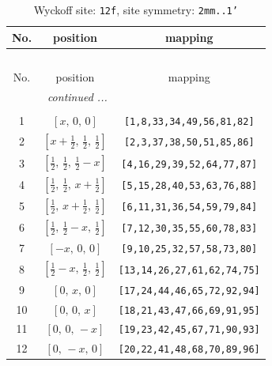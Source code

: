 \documentclass[fleqn,8pt]{jsarticle}
\begin{document}
\begin{longtable}{ccc}
\caption{Wyckoff site: {\tt 12f}, site symmetry: {\tt 2mm..1'}}
 \\
 \hline \hline
No. & position & mapping \\ \hline \endfirsthead

\multicolumn{2}{l}{\tablename\ \thetable{}} \\
 \hline \hline
No. & position & mapping \\ \hline \endhead

 \hline \hline
\multicolumn{2}{r}{\footnotesize\it continued ...} \\ \endfoot

 \hline \hline
\multicolumn{2}{r}{} \\ \endlastfoot

1 & $\left[ x,\, 0,\, 0 \right]$ & {\tt [1,8,33,34,49,56,81,82]} \\ \hline
2 & $\left[ x + \frac{1}{2},\, \frac{1}{2},\, \frac{1}{2} \right]$ & {\tt [2,3,37,38,50,51,85,86]} \\ \hline
3 & $\left[ \frac{1}{2},\, \frac{1}{2},\, \frac{1}{2} - x \right]$ & {\tt [4,16,29,39,52,64,77,87]} \\ \hline
4 & $\left[ \frac{1}{2},\, \frac{1}{2},\, x + \frac{1}{2} \right]$ & {\tt [5,15,28,40,53,63,76,88]} \\ \hline
5 & $\left[ \frac{1}{2},\, x + \frac{1}{2},\, \frac{1}{2} \right]$ & {\tt [6,11,31,36,54,59,79,84]} \\ \hline
6 & $\left[ \frac{1}{2},\, \frac{1}{2} - x,\, \frac{1}{2} \right]$ & {\tt [7,12,30,35,55,60,78,83]} \\ \hline
7 & $\left[ - x,\, 0,\, 0 \right]$ & {\tt [9,10,25,32,57,58,73,80]} \\ \hline
8 & $\left[ \frac{1}{2} - x,\, \frac{1}{2},\, \frac{1}{2} \right]$ & {\tt [13,14,26,27,61,62,74,75]} \\ \hline
9 & $\left[ 0,\, x,\, 0 \right]$ & {\tt [17,24,44,46,65,72,92,94]} \\ \hline
10 & $\left[ 0,\, 0,\, x \right]$ & {\tt [18,21,43,47,66,69,91,95]} \\ \hline
11 & $\left[ 0,\, 0,\, - x \right]$ & {\tt [19,23,42,45,67,71,90,93]} \\ \hline
12 & $\left[ 0,\, - x,\, 0 \right]$ & {\tt [20,22,41,48,68,70,89,96]} \\
\end{longtable}
\renewcommand{\arraystretch}{1.2}
\end{document}
